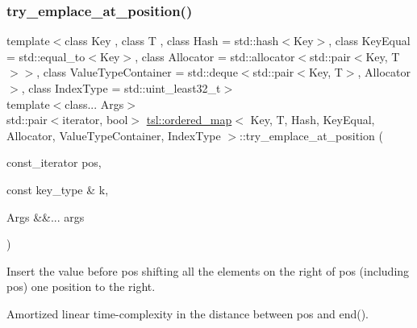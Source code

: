 \subsubsection{\texorpdfstring{try\_emplace\_at\_position()}{try\_emplace\_at\_position()}\hspace{0.1cm}{\footnotesize\ttfamily [1/2]}}
{\footnotesize\ttfamily template$<$class Key , class T , class Hash  = std\+::hash$<$\+Key$>$, class Key\+Equal  = std\+::equal\+\_\+to$<$\+Key$>$, class Allocator  = std\+::allocator$<$std\+::pair$<$\+Key, T$>$$>$, class Value\+Type\+Container  = std\+::deque$<$std\+::pair$<$\+Key, T$>$, Allocator$>$, class Index\+Type  = std\+::uint\+\_\+least32\+\_\+t$>$ \\
template$<$class... Args$>$ \\
std\+::pair$<$iterator, bool$>$ \mbox{\hyperlink{classtsl_1_1ordered__map}{tsl\+::ordered\+\_\+map}}$<$ Key, T, Hash, Key\+Equal, Allocator, Value\+Type\+Container, Index\+Type $>$\+::try\+\_\+emplace\+\_\+at\+\_\+position (\begin{DoxyParamCaption}\item[{const\+\_\+iterator}]{pos,  }\item[{const key\+\_\+type \&}]{k,  }\item[{Args \&\&...}]{args }\end{DoxyParamCaption})\hspace{0.3cm}{\ttfamily [inline]}}





Insert the value before pos shifting all the elements on the right of pos (including pos) one position to the right.

Amortized linear time-\/complexity in the distance between pos and end(). \mbox{\label{classtsl_1_1ordered__map_a21068919c8666ee5c4e5b1f0d199b63c}} 
